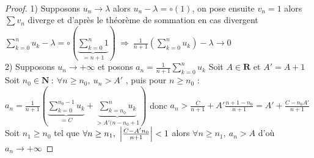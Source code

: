 		 \medskip \\
			
			
		\begin{proof}
			{\small 1)} Supposons $u_n \to \lambda$ alors $u_n - \lambda = \circ (1)$, on pose ensuite $v_n = 1$ alors $\sum v_n$ diverge 
			et d'après le théorème de sommation en cas divergent \\ $\sum_{k=0}^{n} u_k - \lambda = \circ ( \underbrace{\sum_{k=0}^{n} 1}_{=n+1} ) ~
			\Rightarrow ~\frac{1}{n+1} ( \sum_{k=0}^{n} u_k ) - \lambda \to 0$ \\
			{\small 2)} Supposons $u_n \to +\infty$ et posons $a_n = \frac{1}{n+1} \sum_{k=0}^{n} u_k$
			Soit $A\in\mathbf{R}$ et $A'=A+1$ \\ Soit $n_0 \in\mathbf{N} ~:~\forall n\geq n_0 ,~u_n >A'$ , puis pour $n\geq n_0$ :\\
			$a_n = \frac{1}{n+1} ( \underbrace{\sum_{k=0}^{n_0-1} u_k}_{=C} + \underbrace{\sum_{k=n_0}^{n} u_k}_{>A'(n-n_0+1} )$ 
			donc $a_n > \frac{C}{n+1} + A'\frac{n+1-n_0}{n+1} = A' + \frac{C-n_0A'}{n+1}$ \\ 
			Soit $n_1\geq n_0$ tel que $\forall n\geq n_1 ,~\left\vert \frac{C-A'n_0}{n+1} \right\vert <1$ alors $\forall n\geq n_1 ,~a_n > A$ d'où $a_n \to +\infty$
		\end{proof} 

